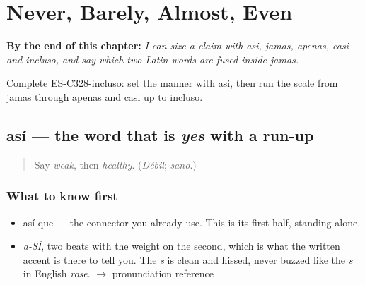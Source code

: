 
\chapter{Never, Barely, Almost, Even}
\label{ch:asi-y-incluso}

\begin{chapteropening}
\textbf{By the end of this chapter:} \emph{I can size a claim with asi, jamas, apenas, casi and incluso, and say which two Latin words are fused inside jamas.}

Complete ES-C328-incluso: set the manner with asi, then run the scale from jamas through apenas and casi up to incluso.
\end{chapteropening}

\section[así]{así — the word that is \emph{yes} with a run-up}

\label{lesson:ES-C328-asi}



\begin{quote}
Say \emph{weak}, then \emph{healthy}. (\emph{Débil}; \emph{sano}.)
\end{quote}

\subsection*{What to know first}
\begin{itemize}
\raggedright
  \item así que — the connector you already use. This is its first half, standing alone.
\end{itemize}

\begin{sounds}
\begin{itemize}
\raggedright
  \item \emph{a-SÍ}, two beats with the weight on the second, which is what the written accent is there to tell you. The \emph{s} is clean and hissed, never buzzed like the \emph{s} in English \emph{rose}. $\to$ pronunciation reference
\end{itemize}
\end{sounds}

